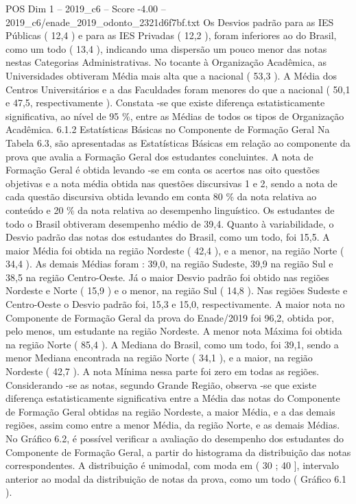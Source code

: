\begin{textsample}{POS Dim 1 – 2019\_c6 – Score -4.00 – 2019\_c6/enade\_2019\_odonto\_2321d6f7bf.txt}
Os Desvios padrão para as IES Públicas ( 12,4 ) e para as IES Privadas ( 12,2 ), foram inferiores ao do Brasil, como um todo ( 13,4 ), indicando uma dispersão um pouco menor das notas nestas Categorias Administrativas.
No tocante à Organização Acadêmica, as Universidades obtiveram Média mais alta que a nacional ( 53,3 ).
A Média dos Centros Universitários e a das Faculdades foram menores do que a nacional ( 50,1 e 47,5, respectivamente ).
Constata -se que existe diferença estatisticamente significativa, ao nível de 95 \%, entre as Médias de todos os tipos de Organização Acadêmica. 6.1.2 Estatísticas Básicas no Componente de Formação Geral Na Tabela 6.3, são apresentadas as Estatísticas Básicas em relação ao componente da prova que avalia a Formação Geral dos estudantes concluintes.
A nota de Formação Geral é obtida levando -se em conta os acertos nas oito questões objetivas e a nota média obtida nas questões discursivas 1 e 2, sendo a nota de cada questão discursiva obtida levando em conta 80 \% da nota relativa ao conteúdo e 20 \% da nota relativa ao desempenho linguístico.
Os estudantes de todo o Brasil obtiveram desempenho médio de 39,4.
Quanto à variabilidade, o Desvio padrão das notas dos estudantes do Brasil, como um todo, foi 15,5.
A maior Média foi obtida na região Nordeste ( 42,4 ), e a menor, na região Norte ( 34,4 ).
As demais Médias foram : 39,0, na região Sudeste, 39,9 na região Sul e 38,5 na região Centro-Oeste.
Já o maior Desvio padrão foi obtido nas regiões Nordeste e Norte ( 15,9 ) e o menor, na região Sul ( 14,8 ).
Nas regiões Sudeste e Centro-Oeste o Desvio padrão foi, 15,3 e 15,0, respectivamente.
A maior nota no Componente de Formação Geral da prova do Enade/2019 foi 96,2, obtida por, pelo menos, um estudante na região Nordeste.
A menor nota Máxima foi obtida na região Norte ( 85,4 ).
A Mediana do Brasil, como um todo, foi 39,1, sendo a menor Mediana encontrada na região Norte ( 34,1 ), e a maior, na região Nordeste ( 42,7 ).
A nota Mínima nessa parte foi zero em todas as regiões.
Considerando -se as notas, segundo Grande Região, observa -se que existe diferença estatisticamente significativa entre a Média das notas do Componente de Formação Geral obtidas na região Nordeste, a maior Média, e a das demais regiões, assim como entre a menor Média, da região Norte, e as demais Médias.
No Gráfico 6.2, é possível verificar a avaliação do desempenho dos estudantes do Componente de Formação Geral, a partir do histograma da distribuição das notas correspondentes.
A distribuição é unimodal, com moda em ( 30 ; 40 ], intervalo anterior ao modal da distribuição de notas da prova, como um todo ( Gráfico 6.1 ).

\end{textsample}
